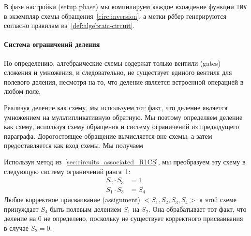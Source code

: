 В фазе настройки (setup phase) мы компилируем каждое вхождение функции $\mathtt{INV}$ в экземпляр схемы обращения~\ref{circ:inversion}, а метки рёбер генерируются согласно правилам из~\ref{def:algebraic-circuit}.
\paragraph{Система ограничений деления}
\label{def:division_circuit} По определению, алгебраические схемы содержат только вентили (gates) сложения и умножения, и следовательно, не существует единого вентиля для полевого деления, несмотря на то, что деление является встроенной операцией в любом поле.

Реализуя деление как схему, мы используем тот факт, что деление является умножением на мультипликативную обратную. Мы поэтому определяем деление как схему, используя схему обращения и систему ограничений из предыдущего параграфа. Дорогостоящее обращение вычисляется вне схемы, а затем предоставляется как вход схемы. Мы получаем
\begin{center}
\end{center} 
Используя метод из~\ref{sec:circuits_associated_R1CS}, мы преобразуем эту схему в следующую систему ограничений ранга~1:
\begin{align*}
S_2 \cdot S_3 &= 1\\
S_1 \cdot S_3 &= S_4
\end{align*}
Любое корректное присваивание (assignment) $<S_1,S_2,S_3,S_4>$ к этой схеме принуждает $S_4$ быть полевым делением $S_1$ на $S_2$. Она обрабатывает тот факт, что деление на $0$ не определено, поскольку не существует корректного присваивания в случае $S_2=0$.


